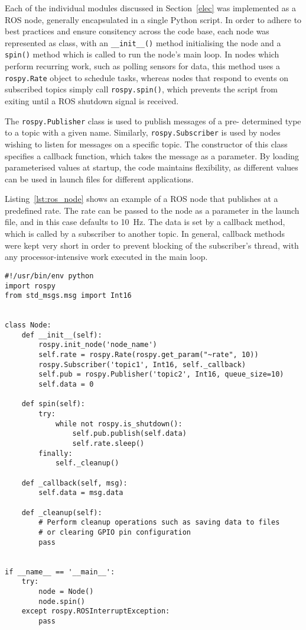Each of the individual modules discussed in Section~\ref{elec} was 
implemented as a ROS node, generally encapsulated in a single Python 
script. In order to adhere to best practices and ensure consitency across 
the code base, each node was represented as class, with an 
\verb|__init__()| method initialising the node and a \verb|spin()| method 
which is called to run the node's main loop. In nodes which perform 
recurring work, such as polling sensors for data, this method uses a 
\verb|rospy.Rate| object to schedule tasks, whereas nodes that respond to 
events on subscribed topics simply call \verb|rospy.spin()|, which 
prevents the script from exiting until a ROS shutdown signal is received.

The \verb|rospy.Publisher| class is used to publish messages of a pre-
determined type to a topic with a given name. Similarly, 
\verb|rospy.Subscriber| is used by nodes wishing to listen for messages on 
a specific topic. The constructor of this class specifies a callback 
function, which takes the message as a parameter. By loading parameterised 
values at startup, the code maintains flexibility, as different values can 
be used in launch files for different applications.

Listing~\ref{lst:ros_node} shows an example of a ROS node that publishes 
at a predefined rate. The rate can be passed to the node as a parameter in 
the launch file, and in this case defaults to \SI{10}{\Hz}. The data is 
set by a callback method, which is called by a subscriber to another 
topic. In general, callback methods were kept very short in order to 
prevent blocking of the subscriber's thread, with any processor-intensive 
work executed in the main loop.

\begin{lstlisting}[caption={Example ROS node}, label={lst:ros_node}]
#!/usr/bin/env python
import rospy
from std_msgs.msg import Int16


class Node:
    def __init__(self):
        rospy.init_node('node_name')
        self.rate = rospy.Rate(rospy.get_param("~rate", 10))
        rospy.Subscriber('topic1', Int16, self._callback)
        self.pub = rospy.Publisher('topic2', Int16, queue_size=10)
        self.data = 0

    def spin(self):
        try:
            while not rospy.is_shutdown():
                self.pub.publish(self.data)
                self.rate.sleep()
        finally:
            self._cleanup()

    def _callback(self, msg):
        self.data = msg.data

    def _cleanup(self):
        # Perform cleanup operations such as saving data to files
        # or clearing GPIO pin configuration
        pass


if __name__ == '__main__':
    try:
        node = Node()
        node.spin()
    except rospy.ROSInterruptException:
        pass
\end{lstlisting}


